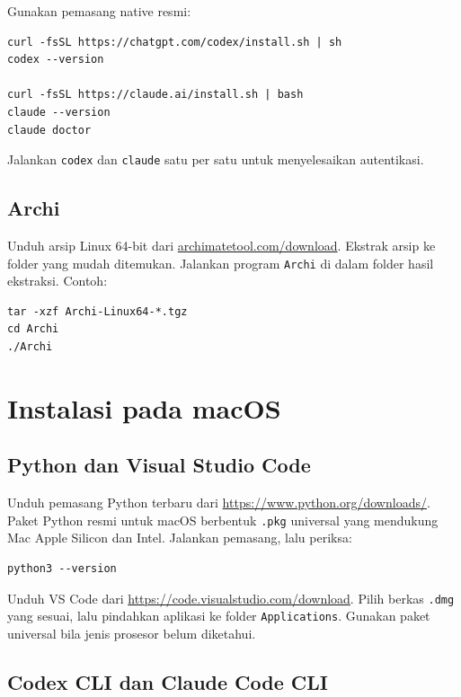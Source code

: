Gunakan pemasang native resmi:

\begin{lstlisting}
curl -fsSL https://chatgpt.com/codex/install.sh | sh
codex --version

curl -fsSL https://claude.ai/install.sh | bash
claude --version
claude doctor
\end{lstlisting}

Jalankan \texttt{codex} dan \texttt{claude} satu per satu untuk menyelesaikan
autentikasi.

\subsection{Archi}

Unduh arsip Linux 64-bit dari
\href{https://www.archimatetool.com/download/}{archimatetool.com/download}.
Ekstrak arsip ke folder yang mudah ditemukan. Jalankan program \texttt{Archi}
di dalam folder hasil ekstraksi. Contoh:

\begin{lstlisting}
tar -xzf Archi-Linux64-*.tgz
cd Archi
./Archi
\end{lstlisting}

\section{Instalasi pada macOS}

\subsection{Python dan Visual Studio Code}

Unduh pemasang Python terbaru dari \url{https://www.python.org/downloads/}.
Paket Python resmi untuk macOS berbentuk \texttt{.pkg} universal yang
mendukung Mac Apple Silicon dan Intel. Jalankan pemasang, lalu periksa:

\begin{lstlisting}
python3 --version
\end{lstlisting}

Unduh VS Code dari \url{https://code.visualstudio.com/download}. Pilih berkas
\texttt{.dmg} yang sesuai, lalu pindahkan aplikasi ke folder
\texttt{Applications}. Gunakan paket universal bila jenis prosesor belum
diketahui.

\subsection{Codex CLI dan Claude Code CLI}


